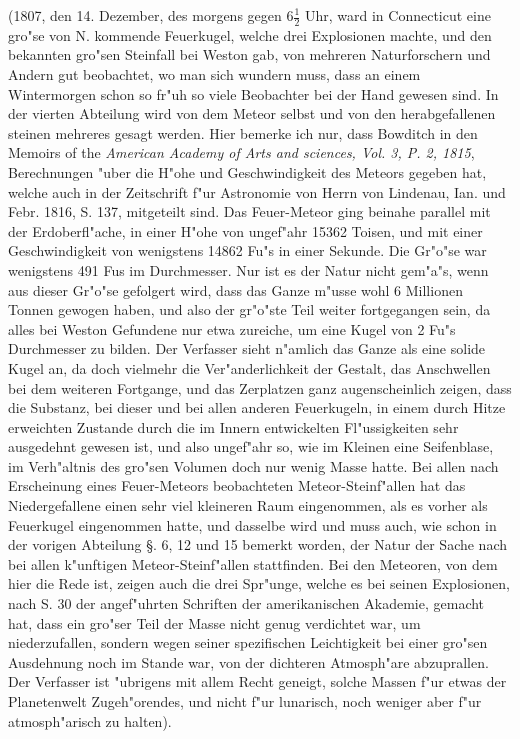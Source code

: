 \documentclass[a4paper, 11pt, oneside, polutonikogreek, german]{article}
\begin{document}
(1807, den 14. Dezember, des morgens gegen $\mathfrak{6\frac{1}{2}}$ Uhr, ward in Connecticut eine gro"se von N. kommende Feuerkugel, welche drei Explosionen machte, und den bekannten gro"sen Steinfall bei Weston gab, von mehreren Naturforschern und Andern gut beobachtet, wo man sich wundern muss, dass an einem Wintermorgen schon so fr"uh so viele Beobachter bei der Hand gewesen sind. In der vierten Abteilung wird von dem Meteor selbst und von den herabgefallenen steinen mehreres gesagt werden. Hier bemerke ich nur, dass Bowditch in den Memoirs of the \emph{American Academy of Arts and sciences, Vol. 3, P. 2, 1815}, Berechnungen "uber die H"ohe und Geschwindigkeit des Meteors gegeben hat, welche auch in der Zeitschrift f"ur Astronomie von Herrn von Lindenau, Ian. und Febr. 1816, S. 137, mitgeteilt sind. Das Feuer-Meteor ging beinahe parallel mit der Erdoberfl"ache, in einer H"ohe von ungef"ahr 15362 Toisen, und mit einer Geschwindigkeit von wenigstens 14862 Fu"s in einer Sekunde. Die Gr"o"se war wenigstens 491 Fus im Durchmesser. Nur ist es der Natur nicht gem"a"s, wenn aus dieser Gr"o"se gefolgert wird, dass das Ganze m"usse wohl 6 Millionen Tonnen gewogen haben, und also der gr"o"ste Teil weiter fortgegangen sein, da alles bei Weston Gefundene nur etwa zureiche, um eine Kugel von 2 Fu"s Durchmesser zu bilden. Der Verfasser sieht n"amlich das Ganze als eine solide Kugel an, da doch vielmehr die Ver"anderlichkeit der Gestalt, das Anschwellen bei dem weiteren Fortgange, und das Zerplatzen ganz augenscheinlich zeigen, dass die Substanz, bei dieser und bei allen anderen Feuerkugeln, in einem durch Hitze erweichten Zustande durch die im Innern entwickelten Fl"ussigkeiten sehr ausgedehnt gewesen ist, und also ungef"ahr so, wie im Kleinen eine Seifenblase, im Verh"altnis des gro"sen Volumen doch nur wenig Masse hatte. Bei allen nach Erscheinung eines Feuer-Meteors beobachteten Meteor-Steinf"allen hat das Niedergefallene einen sehr viel kleineren Raum eingenommen, als es vorher als Feuerkugel eingenommen hatte, und dasselbe wird und muss auch, wie schon in der vorigen Abteilung §. 6, 12 und 15 bemerkt worden, der Natur der Sache nach bei allen k"unftigen Meteor-Steinf"allen stattfinden. Bei den Meteoren, von dem hier die Rede ist, zeigen auch die drei Spr"unge, welche es bei seinen Explosionen, nach S. 30 der angef"uhrten Schriften der amerikanischen Akademie, gemacht hat, dass ein gro"ser Teil der Masse nicht genug verdichtet war, um niederzufallen, sondern wegen seiner spezifischen Leichtigkeit bei einer gro"sen Ausdehnung noch im Stande war, von der dichteren Atmosph"are abzuprallen. Der Verfasser ist "ubrigens mit allem Recht geneigt, solche Massen f"ur etwas der Planetenwelt Zugeh"orendes, und nicht f"ur lunarisch, noch weniger aber f"ur atmosph"arisch zu halten).
\end{document}
